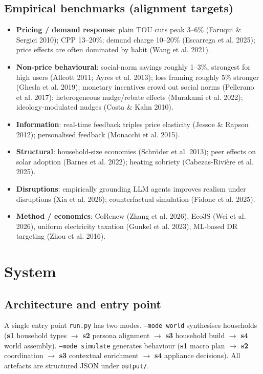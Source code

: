 \documentclass[11pt]{article}
\begin{document}
\subsection{Empirical benchmarks (alignment targets)}
\begin{itemize}
\item \textbf{Pricing / demand response}: plain TOU cuts peak 3--6\% (Faruqui \& Sergici 2010); CPP
13--20\%; demand charge 10--20\% (Escarrega et al. 2025); price effects are often dominated by habit
(Wang et al. 2021).
\item \textbf{Non-price behavioural}: social-norm savings roughly 1--3\%, strongest for high users
(Allcott 2011; Ayres et al. 2013); loss framing roughly 5\% stronger (Ghesla et al. 2019); monetary
incentives crowd out social norms (Pellerano et al. 2017); heterogeneous nudge/rebate effects
(Murakami et al. 2022); ideology-modulated nudges (Costa \& Kahn 2010).
\item \textbf{Information}: real-time feedback triples price elasticity (Jessoe \& Rapson 2012);
personalised feedback (Monacchi et al. 2015).
\item \textbf{Structural}: household-size economies (Schr\"oder et al. 2013); peer effects on solar
adoption (Barnes et al. 2022); heating sobriety (Cabezas-Rivi\`ere et al. 2025).
\item \textbf{Disruptions}: empirically grounding LLM agents improves realism under disruptions
(Xia et al. 2026); counterfactual simulation (Fidone et al. 2025).
\item \textbf{Method / economics}: CoRenew (Zhang et al. 2026), Eco3S (Wei et al. 2026),
uniform electricity taxation (Gunkel et al. 2023), ML-based DR targeting (Zhou et al. 2016).
\end{itemize}

\section{System}
\subsection{Architecture and entry point}
A single entry point \texttt{run.py} has two modes. \texttt{--mode world} synthesises households
(\textbf{s1} household types $\rightarrow$ \textbf{s2} persona alignment $\rightarrow$ \textbf{s3}
household build $\rightarrow$ \textbf{s4} world assembly). \texttt{--mode simulate} generates behaviour
(\textbf{s1} macro plan $\rightarrow$ \textbf{s2} coordination $\rightarrow$ \textbf{s3} contextual
enrichment $\rightarrow$ \textbf{s4} appliance decisions). All artefacts are structured JSON under
\texttt{output/}.
\end{document}
